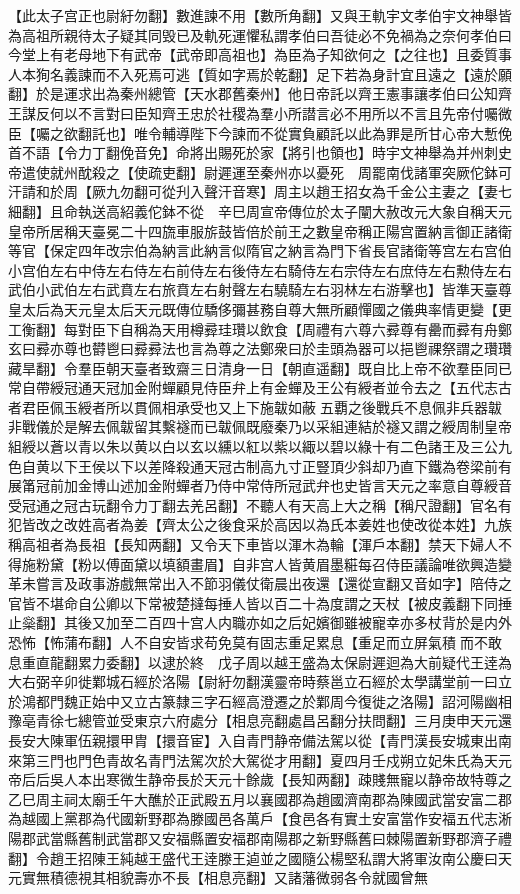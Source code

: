 【此太子宫正也尉紆勿翻】數進諫不用【數所角翻】又與王軌宇文孝伯宇文神舉皆為高祖所親待太子疑其同毁已及軌死運懼私謂孝伯曰吾徒必不免禍為之奈何孝伯曰今堂上有老母地下有武帝【武帝即高祖也】為臣為子知欲何之【之往也】且委質事人本狥名義諫而不入死焉可逃【質如字焉於乾翻】足下若為身計宜且遠之【遠於願翻】於是運求出為秦州總管【天水郡舊秦州】他日帝託以齊王憲事讓孝伯曰公知齊王謀反何以不言對曰臣知齊王忠於社稷為羣小所譛言必不用所以不言且先帝付囑微臣【囑之欲翻託也】唯令輔導陛下今諫而不從實負顧託以此為罪是所甘心帝大慙俛首不語【令力丁翻俛音免】命將出賜死於家【將引也領也】時宇文神舉為并州刺史帝遣使就州酖殺之【使疏吏翻】尉遲運至秦州亦以憂死　周罷南伐諸軍突厥佗鉢可汗請和於周【厥九勿翻可從刋入聲汗音寒】周主以趙王招女為千金公主妻之【妻七細翻】且命執送高紹義佗鉢不從　辛巳周宣帝傳位於太子闡大赦改元大象自稱天元皇帝所居稱天臺冕二十四旒車服旂鼓皆倍於前王之數皇帝稱正陽宫置納言御正諸衛等官【保定四年改宗伯為納言此納言似隋官之納言為門下省長官諸衛等宫左右宫伯小宫伯左右中侍左右侍左右前侍左右後侍左右騎侍左右宗侍左右庶侍左右勲侍左右武伯小武伯左右武賁左右旅賁左右射聲左右驍騎左右羽林左右游擊也】皆準天臺尊皇太后為天元皇太后天元既傳位驕侈彌甚務自尊大無所顧憚國之儀典率情更變【更工衡翻】每對臣下自稱為天用樽彛珪瓚以飲食【周禮有六尊六彛尊有罍而彛有舟鄭玄曰彛亦尊也欎鬯曰彛彛法也言為尊之法鄭衆曰於圭頭為器可以挹鬯祼祭謂之瓚瓚藏旱翻】令羣臣朝天臺者致齋三日清身一日【朝直遥翻】既自比上帝不欲羣臣同已常自帶綬冠通天冠加金附蟬顧見侍臣弁上有金蟬及王公有綬者並令去之【五代志古者君臣佩玉綬者所以貫佩相承受也又上下施韍如蔽五覇之後戰兵不息佩非兵器韍非戰儀於是解去佩韍留其繫襚而已韍佩既廢秦乃以采組連結於襚又謂之綬周制皇帝組綬以蒼以青以朱以黄以白以玄以纁以紅以紫以緅以碧以綠十有二色諸王及三公九色自黄以下王侯以下以差降殺通天冠古制高九寸正豎頂少斜却乃直下鐵為卷梁前有展筩冠前加金博山述加金附蟬者乃侍中常侍所冠武弁也史皆言天元之率意自尊綬音受冠通之冠古玩翻令力丁翻去羌呂翻】不聽人有天高上大之稱【稱尺證翻】官名有犯皆改之改姓高者為姜【齊太公之後食采於高因以為氏本姜姓也使改從本姓】九族稱高祖者為長祖【長知两翻】又令天下車皆以渾木為輪【渾戶本翻】禁天下婦人不得施粉黛【粉以傅面黛以填額畫眉】自非宫人皆黄眉墨糚每召侍臣議論唯欲興造變革未嘗言及政事游戲無常出入不節羽儀仗衛晨出夜還【還從宣翻又音如字】陪侍之官皆不堪命自公卿以下常被楚撻每捶人皆以百二十為度謂之天杖【被皮義翻下同捶止橤翻】其後又加至二百四十宫人内職亦如之后妃嬪御雖被寵幸亦多杖背於是内外恐怖【怖蒲布翻】人不自安皆求苟免莫有固志重足累息【重足而立屏氣積而不敢息重直龍翻累力委翻】以逮於終　戊子周以越王盛為太保尉遲迴為大前疑代王逹為大右弼辛卯徙鄴城石經於洛陽【尉紆勿翻漢靈帝時蔡邕立石經於太學講堂前一曰立於鴻都門魏正始中又立古篆隸三字石經高澄遷之於鄴周今復徙之洛陽】詔河陽幽相豫亳青徐七總管並受東京六府處分【相息亮翻處昌呂翻分扶問翻】三月庚申天元還長安大陳軍伍親擐甲胄【擐音宦】入自青門静帝備法駕以從【青門漢長安城東出南來第三門也門色青故名青門法駕次於大駕從才用翻】夏四月壬戍朔立妃朱氏為天元帝后后吳人本出寒微生静帝長於天元十餘歲【長知两翻】疎賤無寵以静帝故特尊之乙巳周主祠太廟壬午大醮於正武殿五月以襄國郡為趙國濟南郡為陳國武當安富二郡為越國上黨郡為代國新野郡為滕國邑各萬戶【食邑各有實土安富當作安福五代志淅陽郡武當縣舊制武當郡又安福縣置安福郡南陽郡之新野縣舊曰棘陽置新野郡濟子禮翻】令趙王招陳王純越王盛代王逹滕王逌並之國隨公楊堅私謂大將軍汝南公慶曰天元實無積德視其相貌壽亦不長【相息亮翻】又諸藩微弱各令就國曾無